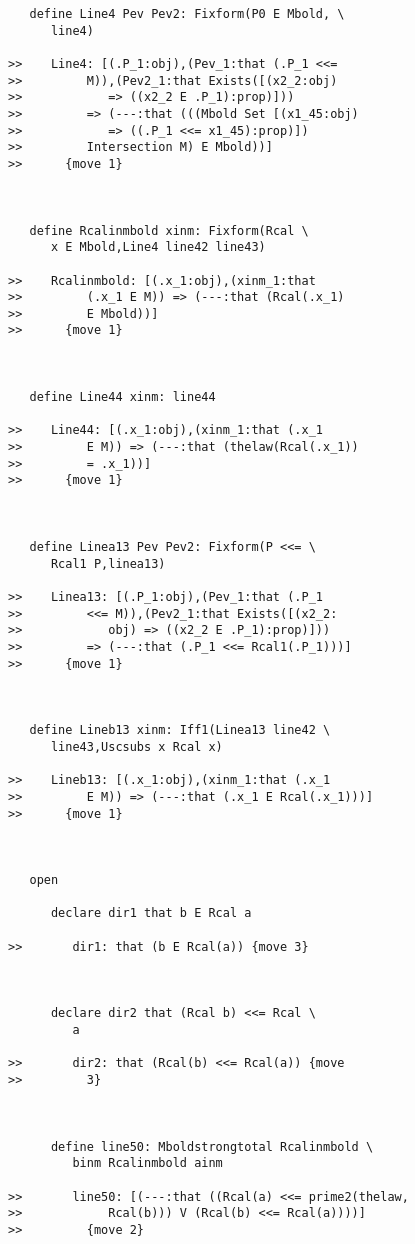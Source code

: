 \documentclass[12pt]{article}
\begin{document}
\begin{verbatim}
   define Line4 Pev Pev2: Fixform(P0 E Mbold, \
      line4)

>>    Line4: [(.P_1:obj),(Pev_1:that (.P_1 <<=
>>         M)),(Pev2_1:that Exists([(x2_2:obj)
>>            => ((x2_2 E .P_1):prop)]))
>>         => (---:that (((Mbold Set [(x1_45:obj)
>>            => ((.P_1 <<= x1_45):prop)])
>>         Intersection M) E Mbold))]
>>      {move 1}



   define Rcalinmbold xinm: Fixform(Rcal \
      x E Mbold,Line4 line42 line43)

>>    Rcalinmbold: [(.x_1:obj),(xinm_1:that
>>         (.x_1 E M)) => (---:that (Rcal(.x_1)
>>         E Mbold))]
>>      {move 1}



   define Line44 xinm: line44

>>    Line44: [(.x_1:obj),(xinm_1:that (.x_1
>>         E M)) => (---:that (thelaw(Rcal(.x_1))
>>         = .x_1))]
>>      {move 1}



   define Linea13 Pev Pev2: Fixform(P <<= \
      Rcal1 P,linea13)

>>    Linea13: [(.P_1:obj),(Pev_1:that (.P_1
>>         <<= M)),(Pev2_1:that Exists([(x2_2:
>>            obj) => ((x2_2 E .P_1):prop)]))
>>         => (---:that (.P_1 <<= Rcal1(.P_1)))]
>>      {move 1}



   define Lineb13 xinm: Iff1(Linea13 line42 \
      line43,Uscsubs x Rcal x)

>>    Lineb13: [(.x_1:obj),(xinm_1:that (.x_1
>>         E M)) => (---:that (.x_1 E Rcal(.x_1)))]
>>      {move 1}



   open

      declare dir1 that b E Rcal a

>>       dir1: that (b E Rcal(a)) {move 3}



      declare dir2 that (Rcal b) <<= Rcal \
         a

>>       dir2: that (Rcal(b) <<= Rcal(a)) {move
>>         3}



      define line50: Mboldstrongtotal Rcalinmbold \
         binm Rcalinmbold ainm

>>       line50: [(---:that ((Rcal(a) <<= prime2(thelaw,
>>            Rcal(b))) V (Rcal(b) <<= Rcal(a))))]
>>         {move 2}




\end{verbatim}
\end{document}
